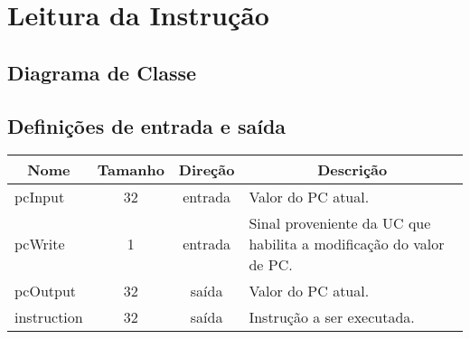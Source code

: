\section{Leitura da Instrução}
	\subsection{Diagrama de Classe}
		\begin{center}
		\end{center}
		
		\subsection{Definições de entrada e saída}
		
	\begin{center}
		\begin{longtable}[pos]{| l | c | c | m{7cm} |} \hline
			\multicolumn{1}{|c|}{\cellcolor[gray]{0.9}\textbf{Nome}} & 
			\multicolumn{1}{c|}{\cellcolor[gray]{0.9}\textbf{Tamanho}} & 
			\multicolumn{1}{c|}{\cellcolor[gray]{0.9}\textbf{Direção}} &
			\multicolumn{1}{c|}{\cellcolor[gray]{0.9}\textbf{Descrição}} \\ \hline
			\endhead
			\hline
			\endlastfoot
			
			pcInput & 32 & entrada & Valor do PC atual.\\ \hline
			pcWrite & 1 & entrada & Sinal proveniente da UC que habilita a modificação do valor de PC. \\ \hline
			pcOutput & 32 & saída & Valor do PC atual. \\ \hline
			instruction & 32 & saída & Instrução a ser executada. \\ \hline
			
		\end{longtable}
	\end{center}